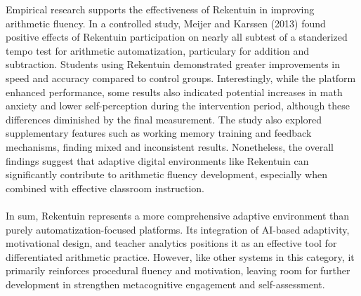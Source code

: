 Empirical research supports the effectiveness of Rekentuin in improving arithmetic fluency. In a controlled study, Meijer and Karssen (2013) \cite{meijer_effecten_nodate} found positive effects of Rekentuin participation on nearly all subtest of a standerized tempo test for arithmetic automatization, particulary for addition and subtraction. Students using Rekentuin demonstrated greater improvements in speed and accuracy compared to control groups. Interestingly, while the platform enhanced performance, some results also indicated potential increases in math anxiety and lower self-perception during the intervention period, although these differences diminished by the final measurement. The study also explored supplementary features such as working memory training and feedback mechanisms, finding mixed and inconsistent results. Nonetheless, the overall findings suggest that adaptive digital environments like Rekentuin can significantly contribute to arithmetic fluency development, especially when combined with effective classroom instruction. \\ \\
In sum, Rekentuin represents a more comprehensive adaptive environment than purely automatization-focused platforms. Its integration of AI-based adaptivity, motivational design, and teacher analytics positions it as an effective tool for differentiated arithmetic practice. However, like other systems in this category, it primarily reinforces procedural fluency and motivation, leaving room for further development in strengthen metacognitive engagement and self-assessment.

